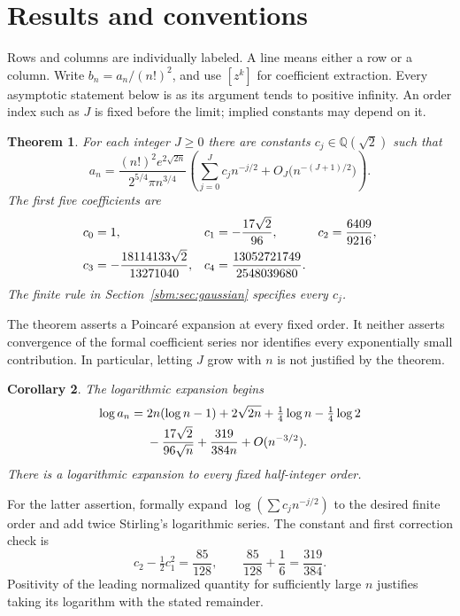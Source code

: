 \documentclass[11pt,letterpaper]{article}
\numberwithin{equation}{section}
\newtheorem{theorem}{Theorem}[section]
\newtheorem{corollary}[theorem]{Corollary}
\theoremstyle{remark}\newtheorem{remark}[theorem]{Remark}
\newcommand{\QQ}{\mathbb Q}
\begin{document}
\section{Results and conventions}\label{sbm:sec:results}
Rows and columns are individually labeled. A line means either a row
or a column. Write $b_n=a_n/(n!)^2$, and use $[z^k]$ for coefficient
extraction. Every asymptotic statement below is as its argument tends
to positive infinity. An order index such as $J$ is fixed before the
limit; implied constants may depend on it.

\begin{theorem}\label{sbm:thm:main}
For each integer $J\geq0$ there are constants $c_j\in\QQ(\sqrt2)$ such
that
\begin{equation}\label{sbm:eq:main}
 a_n=\frac{(n!)^2e^{2\sqrt{2n}}}{2^{5/4}\pi n^{3/4}}
 \left(\sum_{j=0}^J c_jn^{-j/2}
              +O_J\bigl(n^{-(J+1)/2}\bigr)\right).
\end{equation}
The first five coefficients are
\begin{align}\label{sbm:eq:cs}
 c_0&=1,&c_1&=-\frac{17\sqrt2}{96},&c_2&=\frac{6409}{9216},\notag\\
 c_3&=-\frac{18114133\sqrt2}{13271040},&
 c_4&=\frac{13052721749}{2548039680}.
\end{align}
The finite rule in Section~\ref{sbm:sec:gaussian} specifies every $c_j$.
\end{theorem}
The theorem asserts a Poincar\'e expansion at every fixed order. It
neither asserts convergence of the formal coefficient series nor
identifies every exponentially small contribution. In particular,
letting $J$ grow with $n$ is not justified by the theorem.

\begin{corollary}\label{sbm:cor:log}
The logarithmic expansion begins
\begin{align}\label{sbm:eq:log}
 \log a_n={}&2n(\log n-1)+2\sqrt{2n}
       +\tfrac14\log n-\tfrac14\log2\notag\\
 &-\frac{17\sqrt2}{96\sqrt n}+\frac{319}{384n}
       +O(n^{-3/2}).
\end{align}
There is a logarithmic expansion to every fixed half-integer order.
\end{corollary}
For the latter assertion, formally expand
$\log(\sum c_jn^{-j/2})$ to the desired finite order and add twice
Stirling's logarithmic series. The constant and first correction check
is
\[
 c_2-\tfrac12c_1^2=\frac{85}{128},\qquad
 \frac{85}{128}+\frac16=\frac{319}{384}.
\]
Positivity of the leading normalized quantity for sufficiently large
$n$ justifies taking its logarithm with the stated remainder.
\end{document}
